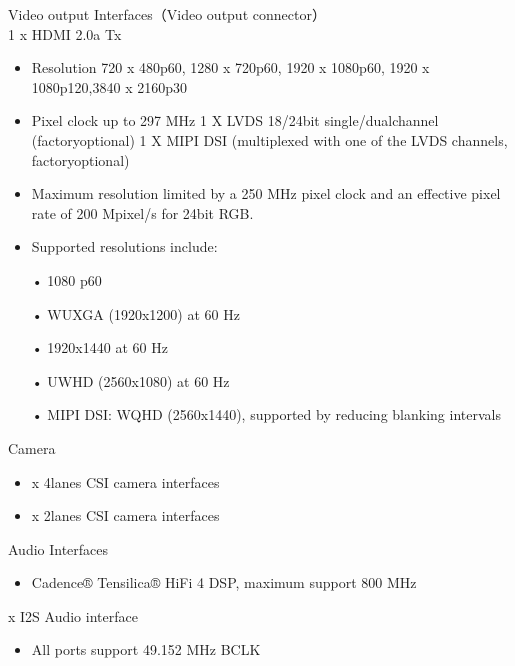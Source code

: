 \documentclass[letterpaper,10pt,openany,english]{sphinxmanual}
\begin{document}
\sphinxAtStartPar
Video output Interfaces（Video output connector）\\
1 x HDMI 2.0a Tx
\begin{itemize}
\item {} 
\sphinxAtStartPar
Resolution 720 x 480p60, 1280 x 720p60, 1920 x 1080p60, 1920 x 1080p120,3840 x  2160p30

\item {} 
\sphinxAtStartPar
Pixel clock up to 297 MHz 1 X LVDS 18/24\sphinxhyphen{}bit single\sphinxhyphen{}/dual\sphinxhyphen{}channel (factory\sphinxhyphen{}optional) 1 X MIPI DSI (multiplexed with one of the LVDS channels, factory\sphinxhyphen{}optional)

\item {} 
\sphinxAtStartPar
Maximum resolution limited by a 250 MHz pixel clock and an effective pixel rate of 200 Mpixel/s for 24\sphinxhyphen{}bit RGB.

\item {} 
\sphinxAtStartPar
Supported resolutions include:

\sphinxAtStartPar
• 1080 p60

\sphinxAtStartPar
• WUXGA (1920x1200) at 60 Hz

\sphinxAtStartPar
• 1920x1440 at 60 Hz

\sphinxAtStartPar
• UWHD (2560x1080) at 60 Hz

\sphinxAtStartPar
• MIPI DSI: WQHD (2560x1440), supported by reducing blanking intervals

\end{itemize}

\sphinxAtStartPar
Camera
\begin{itemize}
\item {} 
 x 4\sphinxhyphen{}lanes CSI camera interfaces

\item {} 
 x 2\sphinxhyphen{}lanes CSI camera interfaces

\end{itemize}

\sphinxAtStartPar
Audio Interfaces
\begin{itemize}
\item {} 
\sphinxAtStartPar
Cadence® Tensilica® HiFi 4 DSP, maximum support 800 MHz

\end{itemize}

 x I2S Audio interface
\begin{itemize}
\item {} 
\sphinxAtStartPar
All ports support 49.152 MHz BCLK

\end{itemize}
\end{document}
